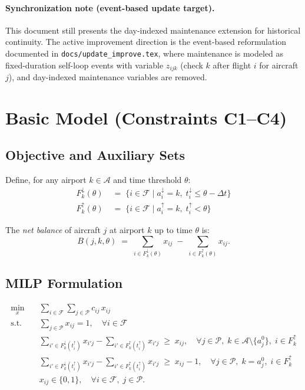 \documentclass[11pt, a4paper]{article}
\theoremstyle{plain}
\theoremstyle{definition}
\theoremstyle{remark}
\newcommand{\F}{\mathcal{F}}        %
\newcommand{\P}{\mathcal{P}}        %
\newcommand{\A}{\mathcal{A}}        %
\newcommand{\Fl}[2]{F^{\downarrow}_{#1}(#2)}   %
\newcommand{\Fd}[2]{F^{\uparrow}_{#1}(#2)}     %
\newcommand{\aI}[1]{a^{\downarrow}_{#1}}        %
\newcommand{\aD}[1]{a^{\uparrow}_{#1}}          %
\newcommand{\tI}[1]{t^{\downarrow}_{#1}}        %
\newcommand{\tD}[1]{t^{\uparrow}_{#1}}          %
\newcommand{\dt}{\Delta t}                       %
\begin{document}
\paragraph{Synchronization note (event-based update target).}
This document still presents the day-indexed maintenance extension for
historical continuity. The active improvement direction is the event-based
reformulation documented in \texttt{docs/update\_improve.tex}, where
maintenance is modeled as fixed-duration self-loop events with variable
$z_{ijk}$ (check $k$ after flight $i$ for aircraft $j$), and day-indexed
maintenance variables are removed.

\section{Basic Model (Constraints C1--C4)}

\subsection{Objective and Auxiliary Sets}

Define, for any airport $k \in \A$ and time threshold $\theta$:
\begin{align}
  \Fl{k}{\theta} &\;=\; \{i \in \F \mid \aI{i} = k,\; \tI{i} \leq \theta - \dt\} \\
  \Fd{k}{\theta} &\;=\; \{i \in \F \mid \aD{i} = k,\; \tD{i} < \theta\}
\end{align}

The \emph{net balance} of aircraft $j$ at airport $k$ up to time $\theta$ is:
\begin{equation}
  B(j, k, \theta) \;=\;
    \sum_{i \in \Fl{k}{\theta}} x_{ij}
    \;-\; \sum_{i \in \Fd{k}{\theta}} x_{ij}.
\end{equation}

\subsection{MILP Formulation}

\begin{align}
  \min_{x} \quad & \sum_{i \in \F} \sum_{j \in \P} c_{ij}\, x_{ij} \label{eq:obj} \\[6pt]
  \text{s.t.} \quad
  & \sum_{j \in \P} x_{ij} = 1, \quad \forall i \in \F \label{eq:c1} \\[4pt]
  & \sum_{i' \in \Fl{k}{\tD{i}}} x_{i'j}
    - \sum_{i' \in \Fd{k}{\tD{i}}} x_{i'j}
    \;\geq\; x_{ij}, \quad
    \forall j \in \P,\; k \in \A \setminus \{a^0_j\},\; i \in F^{\uparrow}_k
    \label{eq:c2} \\[4pt]
  & \sum_{i' \in \Fl{k}{\tD{i}}} x_{i'j}
    - \sum_{i' \in \Fd{k}{\tD{i}}} x_{i'j}
    \;\geq\; x_{ij} - 1, \quad
    \forall j \in \P,\; k = a^0_j,\; i \in F^{\uparrow}_k
    \label{eq:c3} \\[4pt]
  & x_{ij} \in \{0,1\}, \quad \forall i \in \F,\; j \in \P. \label{eq:bin}
\end{align}
\end{document}
